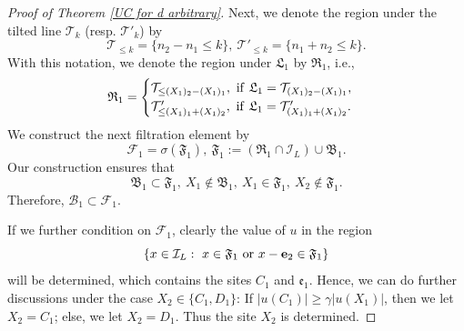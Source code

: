 \documentclass[11pt,reqno,UTF8,twoside]{amsart}
\newcommand{\bfe}{\mathbf{e}}
\newcommand{\mcB}{\mathcal{B}}
\newcommand{\mcF}{\mathcal{F}}
\newcommand{\mcI}{\mathcal{I}}
\newcommand{\mcT}{\mathcal{T}}
\theoremstyle{definition}
\numberwithin{equation}{section}
\begin{document}
\begin{proof}[Proof of Theorem \ref{UC for d arbitrary}]
Next, we denote the region under the tilted line $\mcT_k$ (resp. $\mcT'_k$) by 
\[\mcT_{\leq k}= \{n_2-n_1\leq k \}, \ \mcT'_{\leq k}= \{n_1+n_2\leq k\}.\]
With this notation, we denote the region under $\mathfrak{L}_1$ by $\mathfrak{R}_1$, i.e.,  
\begin{equation*}
  \mathfrak{R}_1 = 
  \begin{cases}
    \mcT_{\leq (X_1)_2-(X_1)_1},\ {\rm if }\ \mathfrak{L}_1=\mcT_{(X_1)_2-(X_1)_1}, \\
    \mcT'_{\leq (X_1)_1+(X_1)_2},\ {\rm if }\ \mathfrak{L}_1=\mcT'_{(X_1)_1+(X_1)_2}.
  \end{cases}
\end{equation*}
We construct the next filtration element by 
\begin{equation}\label{mcF 1}
    \mcF_1=\sigma(\mathfrak{F}_1), \ \mathfrak{F}_1:= (\mathfrak{R}_1\cap \mcI_L )\cup \mathfrak{B}_1.
\end{equation}
Our construction ensures that 
\begin{equation}\label{1 step relation}
 \mathfrak{B}_1 \subset \mathfrak{F}_1, \  X_1 \notin \mathfrak{B}_1, \   X_1\in \mathfrak{F}_1, \ X_2 \notin \mathfrak{F}_1. 
\end{equation}
{Therefore, $\mcB_1\subset \mcF_1$.} 

If we further condition on $\mcF_1$, clearly the value of $u$ in the region 
\[\{ x\in \mcI_L: \ x\in \mathfrak{F}_1  \ {\rm or} \ x-\bfe_2\in \mathfrak{F}_1 \}\]
will be determined, which contains the sites $C_1$ and $\mathfrak{e}_1$. Hence, we can do further discussions under the case $X_2\in \{C_1,D_1\}$: If $|u(C_1)|\geq \gamma |u(X_1)|$, then we let $X_2=C_1$; else, we let $X_2=D_1$. Thus the site $X_2$ is determined. 


\end{proof}
\end{document}
